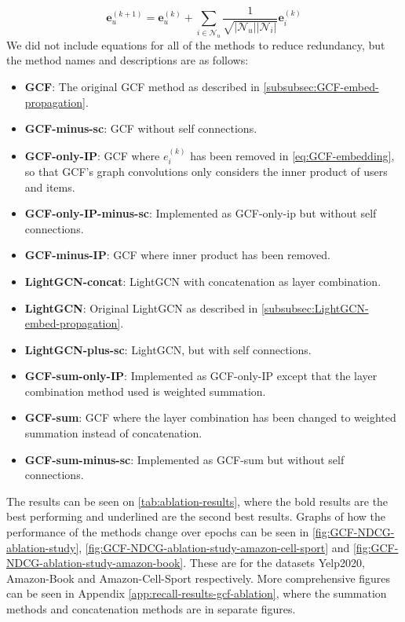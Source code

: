 \begin{equation}
    \mathbf{e}_{u}^{(k+1)} = \mathbf{e}_{u}^{(k)} + \sum^{}_{i \in \mathcal{N}_u}  \frac{1}{\sqrt{|\mathcal{N}_u||\mathcal{N}_i|}} \mathbf{e}_i^{(k)}
    \label{eq:GCF-minus-IP}
\end{equation}
We did not include equations for all of the methods to reduce redundancy, but the method names and descriptions are as follows:
\begin{itemize}
    \item \textbf{GCF}: The original GCF method as described in \autoref{subsubsec:GCF-embed-propagation}.
    \item \textbf{GCF-minus-sc}: GCF without self connections.
    \item \textbf{GCF-only-IP}:  GCF where $e_i^{(k)}$ has been removed in \autoref{eq:GCF-embedding}, so that GCF's graph convolutions only considers the inner product of users and items.
    \item \textbf{GCF-only-IP-minus-sc}: Implemented as GCF-only-ip but without self connections.
    \item \textbf{GCF-minus-IP}: GCF where inner product has been removed.
    \item \textbf{LightGCN-concat}: LightGCN with concatenation as layer combination.
    \item \textbf{LightGCN}: Original LightGCN as described in \autoref{subsubsec:LightGCN-embed-propagation}.
    \item \textbf{LightGCN-plus-sc}: LightGCN, but with self connections.
    \item \textbf{GCF-sum-only-IP}: Implemented as GCF-only-IP except that the layer combination method used is weighted summation.
    \item \textbf{GCF-sum}: GCF where the layer combination has been changed to weighted summation instead of concatenation.
    \item \textbf{GCF-sum-minus-sc}: Implemented as GCF-sum but without self connections.
\end{itemize}
The results can be seen on \autoref{tab:ablation-results}, where the bold results are the best performing and underlined are the second best results.
Graphs of how the performance of the methods change over epochs can be seen in \autoref{fig:GCF-NDCG-ablation-study}, \autoref{fig:GCF-NDCG-ablation-study-amazon-cell-sport} and \autoref{fig:GCF-NDCG-ablation-study-amazon-book}.
These are for the datasets Yelp2020, Amazon-Book and Amazon-Cell-Sport respectively.
More comprehensive figures can be seen in Appendix \ref{app:recall-results-gcf-ablation}, where the summation methods and concatenation methods are in separate figures.
